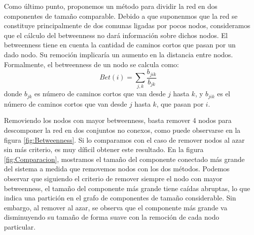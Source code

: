 \par Como último punto, proponemos un método para dividir la red en dos componentes de tamaño comparable. Debido a que suponenmos que la red se constituye principalmente de dos comunas ligadas por pocos nodos, consideramos que el cálculo del betweenness no dará información sobre dichos nodos. El betweenness tiene en cuenta la cantidad de caminos cortos que pasan por un dado nodo. Su remoción implicaría un aumento en la distancia entre nodos. Formalmente, el betweenness de un nodo se calcula como:
\begin{equation}
	Bet(i) = \sum_{j,k} \frac{b_{jik}}{b_{jk}}
\end{equation}
donde $b_{jk}$ es número de caminos cortos que van desde $j$ hasta $k$, y $b_{jik}$ es el número de caminos cortos que van desde $j$ hasta $k$, que pasan por $i$.
\par Removiendo los nodos con mayor betweenness, basta remover 4 nodos para descomponer la red en dos conjuntos no conexos, como puede observarse en la figura \ref{fig:Betweenness}. Si lo comparamos con el caso de remover nodos al azar sin más criterio, es muy díficil obtener este resultado. En la figura \ref{fig:Comparacion}, mostramos el tamaño del componente conectado más grande del sistema a medida que removemos nodos con los dos métodos. Podemos observar que siguiendo el criterio de remover siempre el nodo con mayor betweenness, el tamaño del componente más grande tiene caídas abruptas, lo que indica una partición en el grafo de componentes de tamaño considerable. Sin embargo, al remover al azar, se observa que el componente más grande va disminuyendo su tamaño de forma suave con la remoción de cada nodo particular. 


